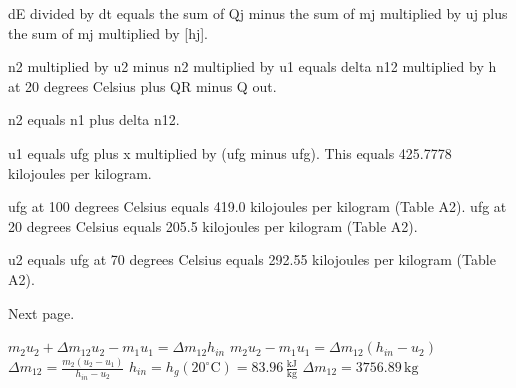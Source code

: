dE divided by dt equals the sum of Qj minus the sum of mj multiplied by uj plus the sum of mj multiplied by [hj].  

n2 multiplied by u2 minus n2 multiplied by u1 equals delta n12 multiplied by h at 20 degrees Celsius plus QR minus Q out.  

n2 equals n1 plus delta n12.  

u1 equals ufg plus x multiplied by (ufg minus ufg).  
This equals 425.7778 kilojoules per kilogram.  

ufg at 100 degrees Celsius equals 419.0 kilojoules per kilogram (Table A2).  
ufg at 20 degrees Celsius equals 205.5 kilojoules per kilogram (Table A2).  

u2 equals ufg at 70 degrees Celsius equals 292.55 kilojoules per kilogram (Table A2).  

Next page.

\( m_2 u_2 + \Delta m_{12} u_2 - m_1 u_1 = \Delta m_{12} h_{in} \)  
\( m_2 u_2 - m_1 u_1 = \Delta m_{12} (h_{in} - u_2) \)  
\( \Delta m_{12} = \frac{m_2 (u_2 - u_1)}{h_{in} - u_2} \)  
\( h_{in} = h_g (20^\circ \text{C}) = 83.96 \, \frac{\text{kJ}}{\text{kg}} \)  
\( \Delta m_{12} = 3756.89 \, \text{kg} \)